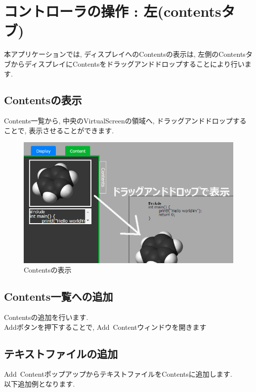 \documentclass[a4paper,10pt,oneside]{jsbook}
\begin{document}
\section{コントローラの操作 : 左(contentsタブ)}
本アプリケーションでは, ディスプレイへのContentsの表示は, 左側のContentsタブからディスプレイにContentsをドラッグアンドドロップすることにより行います.

\subsection{Contentsの表示}
Contents一覧から, 中央のVirtualScreenの領域へ, ドラッグアンドドロップすることで, 表示させることができます.\\

\begin{figure}[htbp]
	\begin{center}
		\includegraphics[width=11.5cm]{image/DragAndDropContent.png}
	\end{center}
	\caption{Contentsの表示}
	\label{fig:draganddropcontent}
\end{figure}

\subsection{Contents一覧への追加}
Contentsの追加を行います.\\
Addボタンを押下することで, Add\ Contentウィンドウを開きます



\subsection{テキストファイルの追加}
Add\ ContentポップアップからテキストファイルをContentsに追加します.\\
以下追加例となります.\\
\end{document}

